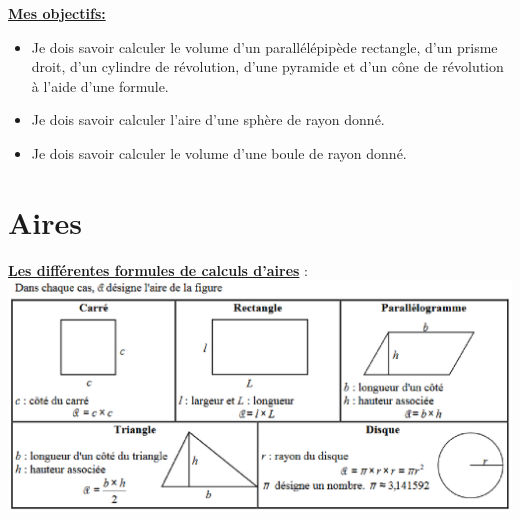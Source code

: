 \documentclass[a4paper,10pt,twoside,french]{article}
\begin{document}
\setcounter{page}{0}

\begin{minipage}{.9\textwidth}

\renewcommand{\contentsname}{\sffamily Plan du cours}

\large

\tableofcontents

\end{minipage}
\newpage
 \setcounter{page}{1}
 
 

 \vspace*{0.2cm}

\textbf{\underline{{\large Mes objectifs:}}}

\begin{itemize}[label=$\hookrightarrow$]
\item Je dois savoir calculer le volume d'un parallélépipède rectangle, d'un prisme droit, d'un cylindre de révolution, d'une pyramide et d'un cône de révolution à l'aide d'une formule.

\item Je dois savoir calculer l'aire d'une sphère de rayon donné.

\item Je dois savoir calculer le volume d'une boule de rayon donné.



\end{itemize}

 \vspace*{0.5cm}


 
 
\section{Aires}
 
\underline{\textbf{{\large Les différentes formules de calculs d'aires}}} :\\

\includegraphics[scale=1.1]{aires.eps} \\
\end{document}
